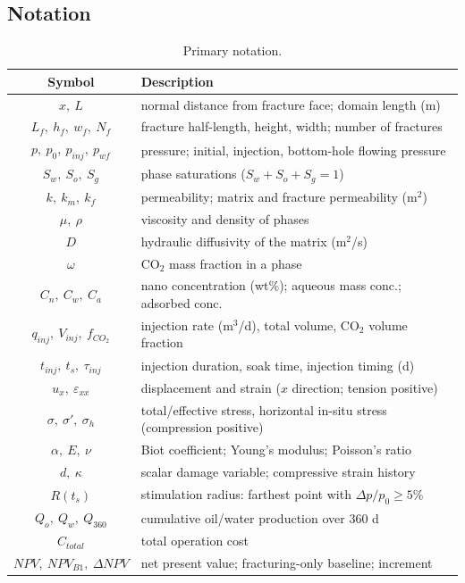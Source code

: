 \subsection{Notation}
\begin{table}[h!t]
\centering
\caption{Primary notation.}
\label{tbl:notation}
\small
\begin{tabular}{cl}
\toprule[1.5pt]
Symbol & Description\\
\midrule[1pt]
$x,\ L$ & normal distance from fracture face; domain length (m)\\
$L_f,\ h_f,\ w_f,\ N_f$ & fracture half-length, height, width; number of fractures\\
$p,\ p_0,\ p_{inj},\ p_{wf}$ & pressure; initial, injection, bottom-hole flowing pressure\\
$S_w,\ S_o,\ S_g$ & phase saturations ($S_w+S_o+S_g=1$)\\
$k,\ k_m,\ k_f$ & permeability; matrix and fracture permeability (m$^2$)\\
$\mu,\ \rho$ & viscosity and density of phases\\
$D$ & hydraulic diffusivity of the matrix (m$^2$/s)\\
$\omega$ & CO$_2$ mass fraction in a phase\\
$C_n,\ C_w,\ C_a$ & nano concentration (wt\%); aqueous mass conc.; adsorbed conc.\\
$q_{inj},\ V_{inj},\ f_{CO_2}$ & injection rate (m$^3$/d), total volume, CO$_2$ volume fraction\\
$t_{inj},\ t_s,\ \tau_{inj}$ & injection duration, soak time, injection timing (d)\\
$u_x,\ \varepsilon_{xx}$ & displacement and strain ($x$ direction; tension positive)\\
$\sigma,\ \sigma',\ \sigma_h$ & total/effective stress, horizontal in-situ stress (compression positive)\\
$\alpha,\ E,\ \nu$ & Biot coefficient; Young's modulus; Poisson's ratio\\
$d,\ \kappa$ & scalar damage variable; compressive strain history\\
$R(t_s)$ & stimulation radius: farthest point with $\Delta p / p_0 \ge 5\%$\\
$Q_o,\ Q_w,\ Q_{360}$ & cumulative oil/water production over 360 d\\
$C_{total}$ & total operation cost\\
$NPV,\ NPV_{B1},\ \Delta NPV$ & net present value; fracturing-only baseline; increment\\
\bottomrule[1.5pt]
\end{tabular}
\end{table}

